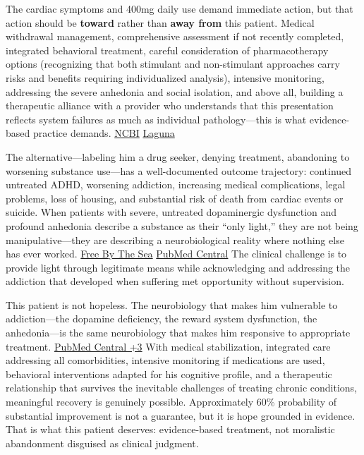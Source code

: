 The cardiac symptoms and 400mg daily use demand immediate action, but that action should be \textbf{toward} rather than \textbf{away from} this patient. Medical withdrawal management, comprehensive assessment if not recently completed, integrated behavioral treatment, careful consideration of pharmacotherapy options (recognizing that both stimulant and non-stimulant approaches carry risks and benefits requiring individualized analysis), intensive monitoring, addressing the severe anhedonia and social isolation, and above all, building a therapeutic alliance with a provider who understands that this presentation reflects system failures as much as individual pathology---this is what evidence-based practice demands. \href{https://www.ncbi.nlm.nih.gov/books/NBK310652/}{NCBI} \href{https://lagunatreatment.com/medical-detox/tapering-methods/}{Laguna}

The alternative---labeling him a drug seeker, denying treatment, abandoning to worsening substance use---has a well-documented outcome trajectory: continued untreated ADHD, worsening addiction, increasing medical complications, legal problems, loss of housing, and substantial risk of death from cardiac events or suicide. When patients with severe, untreated dopaminergic dysfunction and profound anhedonia describe a substance as their ``only light,'' they are not being manipulative---they are describing a neurobiological reality where nothing else has ever worked. \href{https://freebythesea.com/the-sad-connection-between-addiction-and-isolation/}{Free By The Sea} \href{https://pmc.ncbi.nlm.nih.gov/articles/PMC8259283/}{PubMed Central} The clinical challenge is to provide light through legitimate means while acknowledging and addressing the addiction that developed when suffering met opportunity without supervision.

This patient is not hopeless. The neurobiology that makes him vulnerable to addiction---the dopamine deficiency, the reward system dysfunction, the anhedonia---is the same neurobiology that makes him responsive to appropriate treatment. \href{https://pmc.ncbi.nlm.nih.gov/articles/PMC7236426/}{PubMed Central +3} With medical stabilization, integrated care addressing all comorbidities, intensive monitoring if medications are used, behavioral interventions adapted for his cognitive profile, and a therapeutic relationship that survives the inevitable challenges of treating chronic conditions, meaningful recovery is genuinely possible. Approximately 60\% probability of substantial improvement is not a guarantee, but it is hope grounded in evidence. That is what this patient deserves: evidence-based treatment, not moralistic abandonment disguised as clinical judgment.
